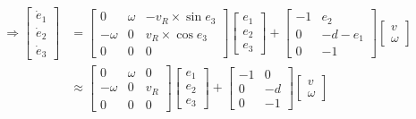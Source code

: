           \begin{align}
               \Rightarrow
               \begin{bmatrix}
               \dot{e}_1 \\
               \dot{e}_2 \\
               \dot{e}_3
               \end{bmatrix} &= \begin{bmatrix}
               0 & \omega & -v_R \times \sin e_3 \\
               -\omega & 0 & v_R \times \cos e_3 \\
               0 & 0 & 0
               \end{bmatrix} \begin{bmatrix}
               e_1 \\
               e_2 \\
               e_3
               \end{bmatrix} + \begin{bmatrix}
               -1 & e_2 \\
               0 & -d - e_1 \\
               0 & -1
               \end{bmatrix} \begin{bmatrix}
               v \\
               \omega
               \end{bmatrix}\\
               &\approx \begin{bmatrix}
               0 & \omega & 0 \\
               -\omega & 0 & v_R \\
               0 & 0 & 0
               \end{bmatrix} \begin{bmatrix}
               e_1 \\
               e_2 \\
               e_3
               \end{bmatrix} + \begin{bmatrix}
               -1 & 0 \\
               0 & -d \\
               0 & -1
               \end{bmatrix} \begin{bmatrix}
               v \\
               \omega
               \end{bmatrix}
               \label{c6_e4}
          \end{align}
